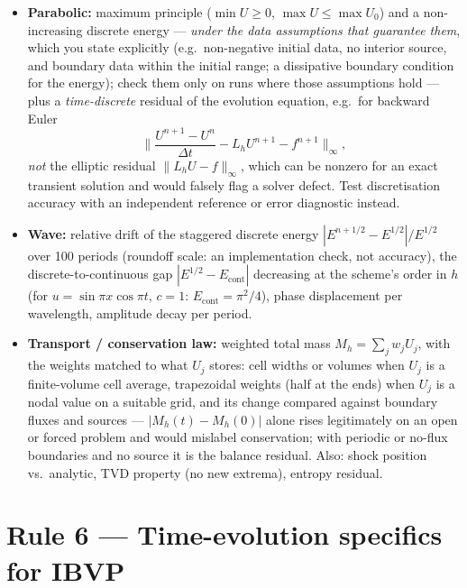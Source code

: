 \documentclass[11pt]{article}
\begin{document}
\begin{itemize}[leftmargin=2em, itemsep=1pt]
  \item\textbf{Parabolic:} maximum principle ($\min U \ge 0$, $\max U \le
        \max U_0$) and a non-increasing discrete energy --- \emph{under the
        data assumptions that guarantee them}, which you state explicitly
        (e.g.\ non-negative initial data, no interior source, and boundary
        data within the initial range; a dissipative boundary condition for
        the energy); check them only on runs where those assumptions hold
        --- plus a \emph{time-discrete} residual of the evolution
        equation, e.g.\ for backward Euler
        \[
        \Big\|\frac{U^{n+1}-U^n}{\Delta t} - L_h U^{n+1} - f^{n+1}\Big\|_\infty,
        \]
        \emph{not} the elliptic residual $\|L_h U - f\|_\infty$, which can be
        nonzero for an exact transient solution and would falsely flag a
        solver defect. Test discretisation accuracy with an independent
        reference or error diagnostic instead.
  \item\textbf{Wave:} relative drift of the staggered discrete energy
        $|E^{n+1/2} - E^{1/2}|/E^{1/2}$ over 100 periods (roundoff scale:
        an implementation check, not accuracy), the discrete-to-continuous
        gap $|E^{1/2} - E_{\mathrm{cont}}|$ decreasing at the scheme's
        order in $h$ (for $u=\sin\pi x\cos\pi t$, $c=1$:
        $E_{\mathrm{cont}}=\pi^2/4$), phase displacement per wavelength,
        amplitude decay per period.
  \item\textbf{Transport / conservation law:} weighted total mass
        $M_h=\sum_j w_j U_j$, with the weights matched to what $U_j$
        stores: cell widths or volumes when $U_j$ is a finite-volume cell
        average, trapezoidal weights (half at the ends) when $U_j$ is a
        nodal value on a suitable grid, and its change compared against
        boundary fluxes and sources ---
        $|M_h(t)-M_h(0)|$ alone rises legitimately on an open or forced
        problem and would mislabel conservation; with periodic or no-flux
        boundaries and no source it is the balance residual. Also: shock
        position vs.\ analytic, TVD property (no new extrema), entropy
        residual.
\end{itemize}

\section*{Rule 6 --- Time-evolution specifics for IBVP}
\end{document}
